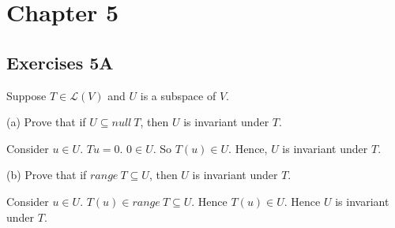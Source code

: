 \section*{Chapter 5}

\subsection*{Exercises 5A}

\begin{problem}{1}
Suppose $T \in \mathcal{L}(V)$ and $U$ is a subspace of $V$.
\end{problem}

(a) Prove that if $U \subseteq null\ T$, then $U$ is invariant under $T$.

Consider $u \in U$. $Tu = 0$. $0 \in U$. So $T(u) \in U$. Hence, $U$ is invariant under $T$.

(b) Prove that if $range\ T \subseteq U$, then $U$ is invariant under $T$.

Consider $u \in U$. $T(u) \in range\ T \subseteq U$. Hence $T(u) \in U$. Hence $U$ is invariant under $T$.


\begin{problem}{2}

\end{problem}
